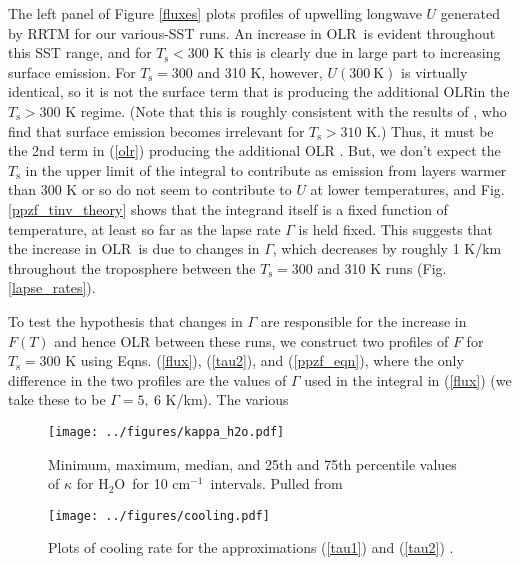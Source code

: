 \documentclass[10pt]{article}
\newcommand{\eqnref}[1]{(\ref{#1})}
\newcommand{\htwo}{\ensuremath{\mathrm{H_2O}}}
\newcommand{\OLR}{\ensuremath{\mathrm{OLR}}}
\newcommand{\cminverse}{\ensuremath{\mathrm{cm^{-1}}}}
\newcommand{\Ts}{\ensuremath{T_\mathrm{s}}}
\begin{document}
The left panel of Figure \ref{fluxes} plots profiles of upwelling longwave $U$ generated by RRTM for our various-SST runs. An increase in \OLR\ is evident throughout this SST range, and for $\Ts< 300 $ K this is clearly due in large part to increasing surface emission. For $\Ts =300$ and 310 K, however,  $U(300\ \mathrm{K})$ is virtually identical, so it is not the surface term that is producing the additional \OLR in the $\Ts > 300 $ K regime. (Note that this is roughly consistent with the results of \cite{goldblatt2013}, who find that surface emission becomes irrelevant for $\Ts >310$ K.)   Thus, it must be the 2nd term in \eqnref{olr} producing the additional OLR . But, we don't expect the $\Ts$ in the upper limit of the integral to contribute as emission from layers warmer than $300$ K or so do not seem to contribute to $U$ at lower temperatures, and Fig. \ref{ppzf_tinv_theory}
shows that the integrand itself is a fixed function of temperature, at least so far as the lapse rate $\Gamma$ is held fixed. This suggests that the increase in \OLR\ is due to changes in $\Gamma$, which decreases by roughly 1 K/km throughout the troposphere between the $\Ts = 300$ and 310 K runs (Fig. \ref{lapse_rates}).

To test the hypothesis that changes in $\Gamma$ are responsible for the increase in $F(T)$ and hence OLR between these runs, we construct two profiles of $F$ for  $\Ts=300$ K using Eqns. \eqnref{flux}, \eqnref{tau2}, and \eqnref{ppzf_eqn}, where the only difference in the two profiles are the values of $\Gamma$ used in the integral in \eqnref{flux} (we take these to be $\Gamma =5,\ 6$ K/km). The various


	
\pagebreak

\begin{figure}[h]
	\begin{center}
			\texttt{[image: ../figures/kappa\_h2o.pdf]}
		\caption{Minimum, maximum, median, and 25th and 75th percentile values of $\kappa$ for \htwo\ for 10 \cminverse\ intervals. Pulled from \cite{pierrehumbert2010}
		\label{kappa_h2o}
		}
	\end{center}
\end{figure}

\begin{figure}[h]
	\begin{center}
			\texttt{[image: ../figures/cooling.pdf]}
		\caption{Plots of cooling rate for the approximations  \eqnref{tau1} and \eqnref{tau2} .
		\label{cooling}
		}
	\end{center}
\end{figure}
\end{document}
